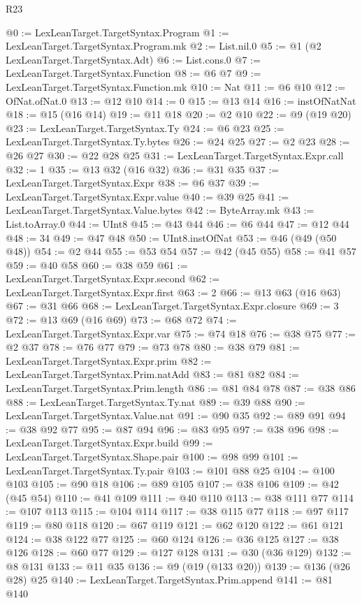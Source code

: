 \begin{lexlean}{R23}
\begin{coremodule}
{{{{{{{{{{{{{{{{{{{{{@0 := LexLeanTarget.TargetSyntax.Program
@1 := LexLeanTarget.TargetSyntax.Program.mk
@2 := List.nil.{0}
@5 := @1 (@2 LexLeanTarget.TargetSyntax.Adt)
@6 := List.cons.{0}
@7 := LexLeanTarget.TargetSyntax.Function
@8 := @6 @7
@9 := LexLeanTarget.TargetSyntax.Function.mk
@10 := Nat
@11 := @6 @10
@12 := OfNat.ofNat.{0}
@13 := @12 @10
@14 := 0
@15 := @13 @14
@16 := instOfNatNat
@18 := @15 (@16 @14)
@19 := @11 @18
@20 := @2 @10
@22 := @9 (@19 @20)
@23 := LexLeanTarget.TargetSyntax.Ty
@24 := @6 @23
@25 := LexLeanTarget.TargetSyntax.Ty.bytes
@26 := @24 @25
@27 := @2 @23
@28 := @26 @27
@30 := @22 @28 @25
@31 := LexLeanTarget.TargetSyntax.Expr.call
@32 := 1
@35 := @13 @32 (@16 @32)
@36 := @31 @35
@37 := LexLeanTarget.TargetSyntax.Expr
@38 := @6 @37
@39 := LexLeanTarget.TargetSyntax.Expr.value
@40 := @39 @25
@41 := LexLeanTarget.TargetSyntax.Value.bytes
@42 := ByteArray.mk
@43 := List.toArray.{0}
@44 := UInt8
@45 := @43 @44
@46 := @6 @44
@47 := @12 @44
@48 := 34
@49 := @47 @48
@50 := UInt8.instOfNat
@53 := @46 (@49 (@50 @48))
@54 := @2 @44
@55 := @53 @54
@57 := @42 (@45 @55)
@58 := @41 @57
@59 := @40 @58
@60 := @38 @59
@61 := LexLeanTarget.TargetSyntax.Expr.second
@62 := LexLeanTarget.TargetSyntax.Expr.first
@63 := 2
@66 := @13 @63 (@16 @63)
@67 := @31 @66
@68 := LexLeanTarget.TargetSyntax.Expr.closure
@69 := 3
@72 := @13 @69 (@16 @69)
@73 := @68 @72
@74 := LexLeanTarget.TargetSyntax.Expr.var
@75 := @74 @18
@76 := @38 @75
@77 := @2 @37
@78 := @76 @77
@79 := @73 @78
@80 := @38 @79
@81 := LexLeanTarget.TargetSyntax.Expr.prim
@82 := LexLeanTarget.TargetSyntax.Prim.natAdd
@83 := @81 @82
@84 := LexLeanTarget.TargetSyntax.Prim.length
@86 := @81 @84 @78
@87 := @38 @86
@88 := LexLeanTarget.TargetSyntax.Ty.nat
@89 := @39 @88
@90 := LexLeanTarget.TargetSyntax.Value.nat
@91 := @90 @35
@92 := @89 @91
@94 := @38 @92 @77
@95 := @87 @94
@96 := @83 @95
@97 := @38 @96
@98 := LexLeanTarget.TargetSyntax.Expr.build
@99 := LexLeanTarget.TargetSyntax.Shape.pair
@100 := @98 @99
@101 := LexLeanTarget.TargetSyntax.Ty.pair
@103 := @101 @88 @25
@104 := @100 @103
@105 := @90 @18
@106 := @89 @105
@107 := @38 @106
@109 := @42 (@45 @54)
@110 := @41 @109
@111 := @40 @110
@113 := @38 @111 @77
@114 := @107 @113
@115 := @104 @114
@117 := @38 @115 @77
@118 := @97 @117
@119 := @80 @118
@120 := @67 @119
@121 := @62 @120
@122 := @61 @121
@124 := @38 @122 @77
@125 := @60 @124
@126 := @36 @125
@127 := @38 @126
@128 := @60 @77
@129 := @127 @128
@131 := @30 (@36 @129)
@132 := @8 @131
@133 := @11 @35
@136 := @9 (@19 (@133 @20))
@139 := @136 (@26 @28) @25
@140 := LexLeanTarget.TargetSyntax.Prim.append
@141 := @81 @140
}}}}}}}}}}}}}}}}}}}}}
\end{coremodule}
\end{lexlean}
